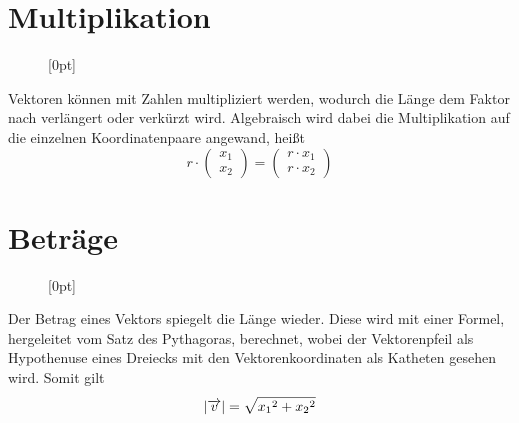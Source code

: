 \documentclass{article}
\begin{document}
\section{Multiplikation}
\begin{wrapfigure}{r}{5cm}
  \centering
  \raisebox{-2cm}[0pt]{
  } 
\end{wrapfigure}
Vektoren können mit Zahlen multipliziert werden, wodurch die Länge dem Faktor nach verlängert oder verkürzt wird. Algebraisch wird dabei die Multiplikation auf die einzelnen Koordinatenpaare angewand, heißt
\[ 
 r \cdot
 \begin{pmatrix} x_1 \\ x_2 \end{pmatrix} =
 \begin{pmatrix} r \cdot x_1 \\ r \cdot x_2 \end{pmatrix} 
\]
 
\section{Beträge}
\begin{wrapfigure}{l}{5cm}
  \centering
  \raisebox{-1.7cm}[0pt]{
  }
\end{wrapfigure}
Der Betrag eines Vektors spiegelt die Länge wieder. Diese wird mit einer Formel, hergeleitet vom Satz des Pythagoras, berechnet, wobei der Vektorenpfeil als Hypothenuse eines Dreiecks mit den Vektorenkoordinaten als Katheten gesehen wird. Somit gilt
\[
 \left| {\overrightarrow{v}} \right| =
 \sqrt{{x_1}^2 + {x_2}^2}
\]
 
\end{document}

